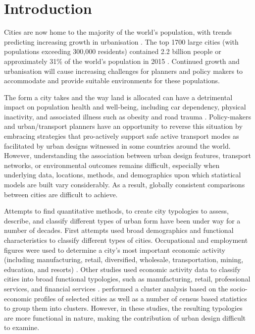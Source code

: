\documentclass[Crown,sageh,times]{sagej}
\begin{document}

\maketitle



\section{Introduction}\label{sec:introduction}

Cities are now home to the majority of the world's population, with trends predicting increasing growth in urbanisation \citep{UNDESA2015,WHO2016,ABS2008}. The top 1700 large cities (with populations exceeding 300,000 residents) contained 2.2 billion people or approximately 31\% of the world's population in 2015 \citep{UN2014}. Continued growth and urbanisation will cause increasing challenges for planners and policy makers to accommodate and provide suitable environments for these populations.

The form a city takes and the way land is allocated can have a detrimental impact on population health and well-being, including car dependency, physical inactivity, and associated illness such as obesity and road trauma \citep{Giles-corti2016,Kleinert2016,Goenka2016,Zapata-Diomedi2017,Heesch2014,Daley2011, Cepeda2016,MingWen2008,Norman2006,Thompson2018b}. Policy-makers and urban/transport planners have an opportunity to reverse this situation by embracing strategies that pro-actively support safe active transport modes as facilitated by urban designs witnessed in some countries around the world. However, understanding the association between urban design features, transport networks, or environmental outcomes remains difficult, especially when underlying data, locations, methods, and demographics upon which statistical models are built vary considerably. As a result, globally consistent comparisons between cities are difficult to achieve. 

Attempts to find quantitative methods, to create city typologies to assess, describe, and classify different types of urban form have been under way for a number of decades. First attempts used broad demographics and functional characteristics to classify different types of cities. Occupational and employment figures were used to determine a city's most important economic activity (including manufacturing, retail, diversified, wholesale, transportation, mining, education, and resorts) \citep{Harris1943}. Other studies used economic activity data to classify cities into broad functional typologies, such as manufacturing, retail, professional services, and financial services \citep{Nelson1955}. \citet{Bruce1971} performed a cluster analysis based on the socio-economic profiles of selected cities as well as a number of census based statistics to group them into clusters. However, in these studies, the resulting typologies are more functional in nature, making the contribution of urban design difficult to examine.
\end{document}
